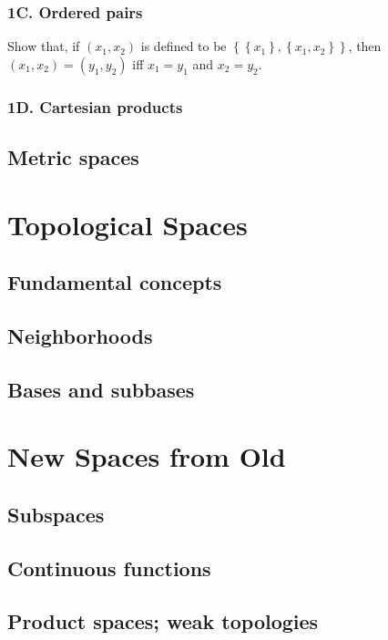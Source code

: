 \documentclass[12pt,oneside]{book}
\theoremstyle{definition}
\begin{document}
\subsection*{1C. Ordered pairs}

Show that, if \( (x_{1}, x_{2}) \) is defined to be \( \left\{ \left\{ x_{1} \right\}, \left\{ x_{1}, x_{2} \right\} \right\} \), then \( (x_{1}, x_{2}) = (y_{1}, y_{2}) \) iff \( x_{1} = y_{1} \) and \( x_{2} = y_{2} \).

\subsection*{1D. Cartesian products}

\section{Metric spaces}

\chapter{Topological Spaces}

\section{Fundamental concepts}

\section{Neighborhoods}

\section{Bases and subbases}

\chapter{New Spaces from Old}

\section{Subspaces}

\section{Continuous functions}

\section{Product spaces; weak topologies}
\end{document}
